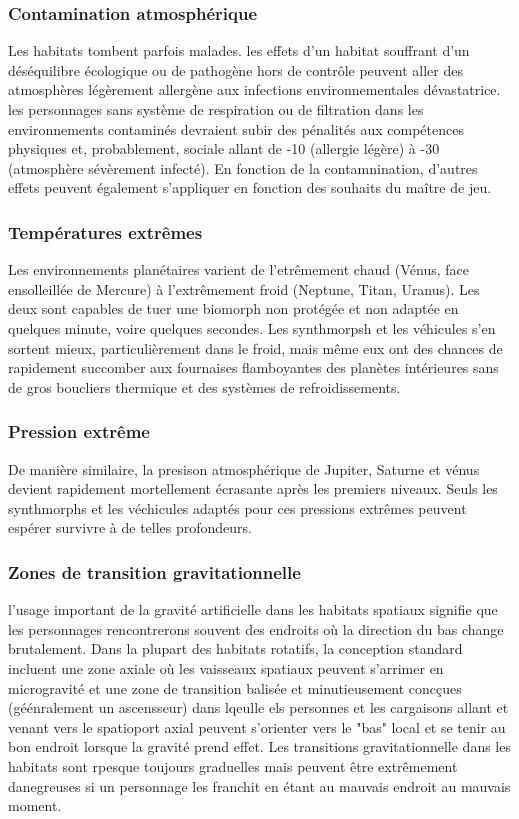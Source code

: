 \subsubsection{Contamination atmosphérique} 

Les habitats tombent parfois malades. les effets d'un habitat souffrant d'un déséquilibre écologique ou de pathogène hors de contrôle peuvent aller des atmosphères légèrement allergène aux infections environnementales dévastatrice. les personnages sans système de respiration ou de filtration dans les environnements contaminés devraient subir des pénalités aux compétences physiques et, probablement, sociale allant de -10 (allergie légère) à -30 (atmosphère sévèrement infecté). En fonction de la contamnination, d'autres effets peuvent également s'appliquer en fonction des souhaits du maître de jeu. 

\subsubsection{Températures extrêmes} 

Les environnements planétaires varient de l'etrêmement chaud (Vénus, face ensolleillée de Mercure) à l'extrêmement froid (Neptune, Titan, Uranus). Les deux sont capables de tuer une biomorph non protégée et non adaptée en quelques minute, voire quelques secondes. Les synthmorpsh et les véhicules s'en sortent mieux, particulièrement dans le froid, mais même eux ont des chances de rapidement succomber aux fournaises flamboyantes des planètes intérieures sans de gros boucliers thermique et des systèmes de refroidissements. 

\subsubsection{Pression extrême} 

De manière similaire, la presison atmosphérique de Jupiter, Saturne et vénus devient rapidement mortellement écrasante après les premiers niveaux. Seuls les synthmorphs et les véchicules adaptés pour ces pressions extrêmes peuvent espérer survivre à de telles profondeurs. 

\subsubsection{Zones de transition gravitationnelle} 

l'usage important de la gravité artificielle dans les habitats spatiaux signifie que les personnages rencontrerons souvent des endroits où la direction du bas change brutalement. Dans la plupart des habitats rotatifs, la conception standard incluent une zone axiale où les vaisseaux spatiaux peuvent s'arrimer en microgravité et une zone de transition balisée et minutieusement concçues (géénralement un ascensseur) dans lqeulle els personnes et les cargaisons allant et venant vers le spatioport axial peuvent s'orienter vers le "bas" local et se tenir au bon endroit lorsque la gravité prend effet. Les transitions gravitationnelle dans les habitats sont rpesque toujours graduelles mais peuvent être extrêmement danegreuses si un personnage les franchit en étant au mauvais endroit au mauvais moment. 


